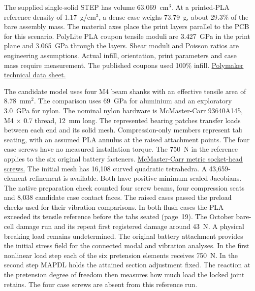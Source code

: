 The supplied single-solid STEP has volume 63.069~cm$^3$. At a printed-PLA reference density of 1.17~g/cm$^3$, a dense case weighs 73.79~g, about 29.3\% of the bare assembly mass. The material axes place the print layers parallel to the PCB for this scenario. PolyLite PLA coupon tensile moduli are 3.427~GPa in the print plane and 3.065~GPa through the layers. Shear moduli and Poisson ratios are engineering assumptions. Actual infill, orientation, print parameters and case mass require measurement. The published coupons used 100\% infill. \href{https://wiki.polymaker.com/polymaker-products/more-about-our-products/documents/technical-data-sheets/pla/polylite-tm-pla}{Polymaker technical data sheet.}

The candidate model uses four M4 beam shanks with an effective tensile area of 8.78~mm$^2$. The comparison uses 69~GPa for aluminium and an exploratory 3.0~GPa for nylon. The nominal nylon hardware is McMaster-Carr 93640A145, M4 $\times$ 0.7 thread, 12~mm long. The represented bearing patches transfer loads between each end and its solid mesh. Compression-only members represent tab seating, with an assumed PLA annulus at the raised attachment points. The four case screws have no measured installation torque. The 750~N in the reference applies to the six original battery fasteners. \href{https://www.mcmaster.com/products/nylon-allen-screws/}{McMaster-Carr metric socket-head screws.}
The initial mesh has 16,108 curved quadratic tetrahedra. A 43,659-element refinement is available. Both have positive minimum scaled Jacobians. The native preparation check counted four screw beams, four compression seats and 8,038 candidate case contact faces. The raised cases passed the preload checks used for their vibration comparisons. In both flush cases the PLA exceeded its tensile reference before the tabs seated (page~19). The October bare-cell damage run and its repeat first registered damage around 43~N. A physical breaking load remains undetermined.
\newpage
{}
The original battery attachment provides the initial stress field for the connected modal and vibration analyses. In the first nonlinear load step each of the six pretension elements receives 750~N. In the second step MAPDL holds the attained section adjustment fixed. The reaction at the pretension degree of freedom then measures how much load the locked joint retains. The four case screws are absent from this reference run.

